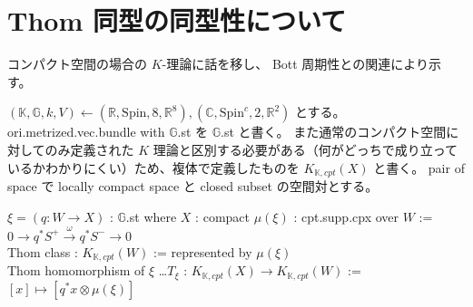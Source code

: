 \documentclass[dvipdfmx]{jsarticle}
\newcommand{\KtheoryCpx}[1]{K_{\mathbb{K},cpt}(#1)}
\begin{document}
\section{Thom 同型の同型性について}
コンパクト空間の場合の \(K\)-理論に話を移し、 Bott 周期性との関連により示す。

\((\mathbb{K} , \mathbb{G} , k , V) \leftarrow (\mathbb{R}, \text{Spin} , 8 , \mathbb{R}^8), (\mathbb{C}, \text{Spin}^c , 2 , \mathbb{R}^2)\) とする。
ori.metrized.vec.bundle with \(\mathbb{G}\).st を \(\mathbb{G}\).st と書く。
また通常のコンパクト空間に対してのみ定義された \(K\) 理論と区別する必要がある（何がどっちで成り立っているかわかりにくい）ため、複体で定義したものを \(\KtheoryCpx{X}\) と書く。
pair of space で locally compact space と closed subset の空間対とする。

\begin{Definition}
\itemwhen
  \Fix \(\xi = (q : W \to X)\) : \(\mathbb{G}\).st where \(X\) : compact
\itemdefi
  \Define \(\mu(\xi)\) : cpt.supp.cpx over \(W\) := \\
  \(0 \to q^*S^+ \overset{\omega}{\to}q^*S^- \to 0\) \\
  \Define Thom class : \(\KtheoryCpx{W}\) := represented by \(\mu(\xi)\) \\
  \Define Thom homomorphism of \(\xi\) \ldots \(T_{\xi}\) : \(\KtheoryCpx{X} \to \KtheoryCpx{W}\) := \([x] \mapsto [q^*x \otimes \mu(\xi)]\)
\end{Definition}


\end{document}
